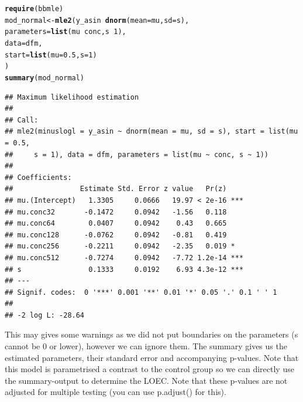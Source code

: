 \documentclass{scrartcl}\usepackage[]{graphicx}\usepackage[]{color}
\makeatletter
\newcommand{\hlnum}[1]{\textcolor[rgb]{0.686,0.059,0.569}{#1}}%
\newcommand{\hlopt}[1]{\textcolor[rgb]{0,0,0}{#1}}%
\newcommand{\hlstd}[1]{\textcolor[rgb]{0.345,0.345,0.345}{#1}}%
\newcommand{\hlkwb}[1]{\textcolor[rgb]{0.69,0.353,0.396}{#1}}%
\newcommand{\hlkwc}[1]{\textcolor[rgb]{0.333,0.667,0.333}{#1}}%
\newcommand{\hlkwd}[1]{\textcolor[rgb]{0.737,0.353,0.396}{\textbf{#1}}}%
\newenvironment{kframe}{%
 \def\at@end@of@kframe{}%
 \ifinner\ifhmode%
  \def\at@end@of@kframe{\end{minipage}}%
  \begin{minipage}{\columnwidth}%
 \fi\fi%
 \def\FrameCommand##1{\hskip\@totalleftmargin \hskip-\fboxsep
 \colorbox{shadecolor}{##1}\hskip-\fboxsep
     \hskip-\linewidth \hskip-\@totalleftmargin \hskip\columnwidth}%
 \MakeFramed {\advance\hsize-\width
   \@totalleftmargin\z@ \linewidth\hsize
   \@setminipage}}%
 {\par\unskip\endMakeFramed%
 \at@end@of@kframe}
\newenvironment{knitrout}{}{} %
\makeatother
\begin{document}
\begin{knitrout}
\color{fgcolor}\begin{kframe}
\begin{alltt}
\hlkwd{require}\hlstd{(bbmle)}
\hlstd{mod_normal} \hlkwb{<-} \hlkwd{mle2}\hlstd{(y_asin} \hlopt{~} \hlkwd{dnorm}\hlstd{(}\hlkwc{mean} \hlstd{= mu,} \hlkwc{sd} \hlstd{= s),}
                   \hlkwc{parameters} \hlstd{=} \hlkwd{list}\hlstd{(mu} \hlopt{~} \hlstd{conc, s} \hlopt{~} \hlnum{1}\hlstd{),}
                   \hlkwc{data} \hlstd{= dfm,}
                   \hlkwc{start} \hlstd{=} \hlkwd{list}\hlstd{(}\hlkwc{mu} \hlstd{=} \hlnum{0.5}\hlstd{,} \hlkwc{s} \hlstd{=} \hlnum{1}\hlstd{)}
                   \hlstd{)}
\hlkwd{summary}\hlstd{(mod_normal)}
\end{alltt}
\begin{verbatim}
## Maximum likelihood estimation
## 
## Call:
## mle2(minuslogl = y_asin ~ dnorm(mean = mu, sd = s), start = list(mu = 0.5, 
##     s = 1), data = dfm, parameters = list(mu ~ conc, s ~ 1))
## 
## Coefficients:
##                Estimate Std. Error z value   Pr(z)    
## mu.(Intercept)   1.3305     0.0666   19.97 < 2e-16 ***
## mu.conc32       -0.1472     0.0942   -1.56   0.118    
## mu.conc64        0.0407     0.0942    0.43   0.665    
## mu.conc128      -0.0762     0.0942   -0.81   0.419    
## mu.conc256      -0.2211     0.0942   -2.35   0.019 *  
## mu.conc512      -0.7274     0.0942   -7.72 1.2e-14 ***
## s                0.1333     0.0192    6.93 4.3e-12 ***
## ---
## Signif. codes:  0 '***' 0.001 '**' 0.01 '*' 0.05 '.' 0.1 ' ' 1
## 
## -2 log L: -28.64
\end{verbatim}
\end{kframe}
\end{knitrout}
This may gives some warnings as we did not put boundaries on the parameters (s cannot be 0 or lower), however we can ignore them.
The summary gives us the estimated parameters, their standard error and accompanying p-values.
Note that this model is parametrised a contrast to the control group so we can directly use the summary-output to determine the LOEC.
Note that these p-values are not adjusted for multiple testing (you can use p.adjust() for this).
\end{document}
